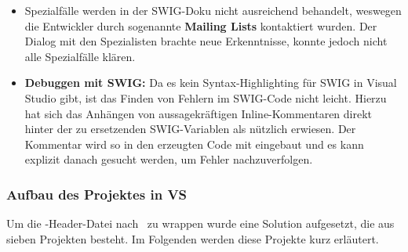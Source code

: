 \begin{itemize}
\begin{itemize}
	\end{itemize}
\item Spezialfälle werden in der SWIG-Doku nicht ausreichend behandelt, weswegen die Entwickler durch sogenannte \textbf{Mailing Lists} kontaktiert wurden. Der Dialog mit den Spezialisten brachte neue Erkenntnisse, konnte jedoch nicht alle Spezialfälle klären. %
\item \textbf{Debuggen mit SWIG:} Da es kein Syntax-Highlighting für SWIG in Visual Studio gibt, ist das Finden von Fehlern im SWIG-Code nicht leicht. Hierzu hat sich das Anhängen von aussagekräftigen Inline-Kommentaren direkt hinter der zu ersetzenden SWIG-Variablen als nützlich erwiesen. Der Kommentar wird so in den erzeugten Code mit eingebaut und es kann explizit danach gesucht werden, um Fehler nachzuverfolgen.
\end{itemize}

\subsubsection{Aufbau des Projektes in VS}\label{subsubsec:Aufbau}

Um die \CC-Header-Datei nach \CS~zu wrappen wurde eine Solution aufgesetzt, die aus sieben Projekten besteht. Im Folgenden werden diese Projekte kurz erläutert.\\


